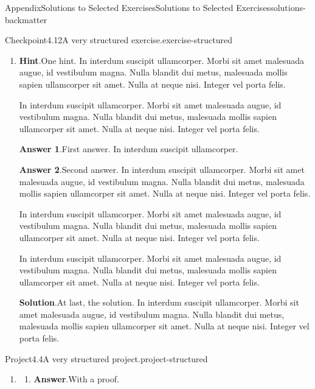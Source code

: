 \documentclass[twoside,10pt,]{article}
\newcommand{\blocktitlefont}{\relax}
\numberwithin{equation}{section}
\begin{document}
\begin{solutions-section}{Appendix}{Solutions to Selected Exercises}{}{Solutions to Selected Exercises}{}{}{solutions-backmatter}
\begin{inlinesolution}{Checkpoint}{4.12}{A very structured exercise.}{exercise-structured}
\begin{enumerate}[font=\bfseries,label=(\alph*),ref=\alph*]
\item[(d)]\noindent\textbf{\blocktitlefont Hint}.\hypertarget{exercise-structured-6-2-back}{}\quad{}One hint.  In interdum suscipit ullamcorper. Morbi sit amet malesuada augue, id vestibulum magna. Nulla blandit dui metus, malesuada mollis sapien ullamcorper sit amet. Nulla at neque nisi. Integer vel porta felis.%
\par
In interdum suscipit ullamcorper. Morbi sit amet malesuada augue, id vestibulum magna. Nulla blandit dui metus, malesuada mollis sapien ullamcorper sit amet. Nulla at neque nisi. Integer vel porta felis.%
\par\smallskip%
\noindent\textbf{\blocktitlefont Answer 1}.\hypertarget{exercise-structured-6-3-back}{}\quad{}First answer.  In interdum suscipit ullamcorper.%
\par\smallskip%
\noindent\textbf{\blocktitlefont Answer 2}.\hypertarget{exercise-structured-6-4-back}{}\quad{}Second answer.  In interdum suscipit ullamcorper. Morbi sit amet malesuada augue, id vestibulum magna. Nulla blandit dui metus, malesuada mollis sapien ullamcorper sit amet. Nulla at neque nisi. Integer vel porta felis.%
\par
In interdum suscipit ullamcorper. Morbi sit amet malesuada augue, id vestibulum magna. Nulla blandit dui metus, malesuada mollis sapien ullamcorper sit amet. Nulla at neque nisi. Integer vel porta felis.%
\par
In interdum suscipit ullamcorper. Morbi sit amet malesuada augue, id vestibulum magna. Nulla blandit dui metus, malesuada mollis sapien ullamcorper sit amet. Nulla at neque nisi. Integer vel porta felis.%
\par\smallskip%
\noindent\textbf{\blocktitlefont Solution}.\hypertarget{exercise-structured-6-5-back}{}\quad{}At last, the solution.  In interdum suscipit ullamcorper. Morbi sit amet malesuada augue, id vestibulum magna. Nulla blandit dui metus, malesuada mollis sapien ullamcorper sit amet. Nulla at neque nisi. Integer vel porta felis.%
\end{enumerate}%
\end{inlinesolution}%
\begin{projectsolution}{Project}{4.4}{A very structured project.}{project-structured}%
\begin{enumerate}[font=\bfseries,label=(\alph*),ref=\alph*]%
\item[(c)]\begin{enumerate}[font=\bfseries,label=(\roman*),ref=\theenumi.\roman*]%
\item[(i)]\noindent\textbf{\blocktitlefont Answer}.\hypertarget{project-structured-6-2-2-back}{}\quad{}With a proof.%

\end{enumerate}
\end{enumerate}
\end{projectsolution}
\end{solutions-section}
\end{document}
